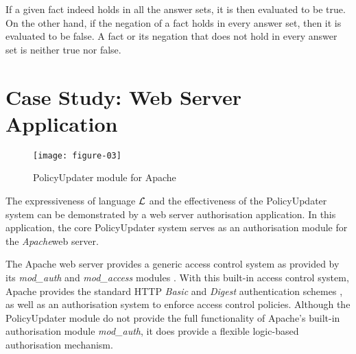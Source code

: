 \documentclass[global,twocolumn,final]{svjour}
\begin{document}

        If a given fact indeed holds in all the answer sets, it is then
        evaluated to be true. On the other hand, if the negation of a fact
        holds in every answer set, then it is evaluated to be false. A fact
        or its negation that does not hold in every answer set is neither true
        nor false.

  \section{Case Study: Web Server Application}
    \label{sec-case}

    \begin{figure}[ht]
      \begin{center}
        \texttt{[image: figure-03]}
        \caption{PolicyUpdater module for Apache}
        \label{fig-3}
      \end{center}
    \end{figure}

    The expressiveness of language $\cal{L}$ and the effectiveness of the
    PolicyUpdater system can be demonstrated by a web server authorisation
    application. In this application, the core PolicyUpdater system serves as
    an authorisation module for the {\em Apache}\footnotemark web server.


    The Apache web server provides a generic access control system as provided
    by its {\em mod\_auth} and {\em mod\_access} modules \cite{AP,LAU}. With
    this built-in access control system, Apache provides the standard HTTP
    {\em Basic} and {\em Digest} authentication schemes \cite{HTTP2}, as well
    as an authorisation system to enforce access control policies. Although the
    PolicyUpdater module do not provide the full functionality of Apache's
    built-in authorisation module {\em mod\_auth}, it does provide a flexible
    logic-based authorisation mechanism.
\end{document}

